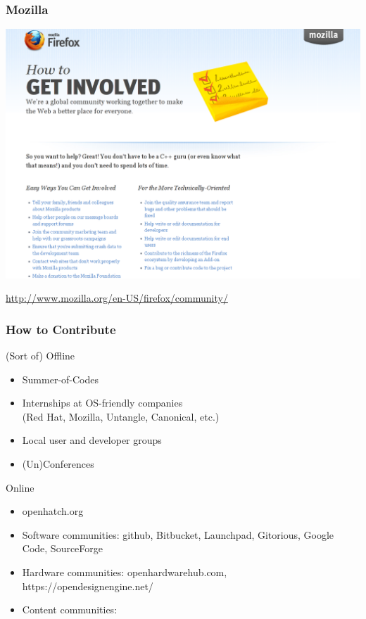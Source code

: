 \documentclass{beamer}
\begin{document}
\begin{frame}
  \frametitle{Mozilla}
  \begin{center} 
    \includegraphics[height=0.8\textheight]{../img/mozilla-get-involved}

    \href{http://www.mozilla.org/en-US/firefox/community/}{http://www.mozilla.org/en-US/firefox/community/}
  \end{center}
\end{frame}

\begin{frame}
  \frametitle{How to Contribute}
  \begin{LARGE} (Sort of) Offline \end{LARGE}
  \begin{itemize}
  \item Summer-of-Codes
  \item Internships at OS-friendly companies \\ (Red Hat, Mozilla, Untangle, Canonical, etc.)
  \item Local user and developer groups
  \item (Un)Conferences
  \end{itemize}

  \vspace{1em}

  \begin{LARGE} Online \end{LARGE}
  \begin{itemize}
  \item openhatch.org
  \item Software communities: github, Bitbucket, Launchpad, Gitorious, Google Code, SourceForge
  \item Hardware communities: openhardwarehub.com, https://opendesignengine.net/
  \item Content communities: 
  \end{itemize}
\end{frame}
\end{document}
